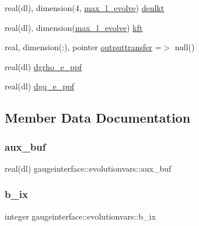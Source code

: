 \begin{DoxyCompactItemize}
real(dl), dimension(4, \mbox{\hyperlink{namespacegaugeinterface_a965f8caba9ba282e718281110e274b04}{max\+\_\+l\+\_\+evolve}}) \mbox{\hyperlink{structgaugeinterface_1_1evolutionvars_ad9969aa011666e0d7a0da67075be6c06}{denlkt}}
\item 
real(dl), dimension(\mbox{\hyperlink{namespacegaugeinterface_a965f8caba9ba282e718281110e274b04}{max\+\_\+l\+\_\+evolve}}) \mbox{\hyperlink{structgaugeinterface_1_1evolutionvars_a8e074f62e4ed5e82fbe9eb46f17981c9}{kft}}
\item 
real, dimension(\+:), pointer \mbox{\hyperlink{structgaugeinterface_1_1evolutionvars_a054b51313d8f8339be066cf5c2b18311}{outputtransfer}} =$>$ null()
\item 
real(dl) \mbox{\hyperlink{structgaugeinterface_1_1evolutionvars_aa21d8b785e5c85c971f522577635ea9a}{dgrho\+\_\+e\+\_\+ppf}}
\item 
real(dl) \mbox{\hyperlink{structgaugeinterface_1_1evolutionvars_a2617a17bdf4a3c6e88026471ac9ff0c3}{dgq\+\_\+e\+\_\+ppf}}
\end{DoxyCompactItemize}


\subsection{Member Data Documentation}
\mbox{\label{structgaugeinterface_1_1evolutionvars_a711dcaaf4415a021db3f399bf58abd7f}} 
\subsubsection{\texorpdfstring{aux\+\_\+buf}{aux\_buf}}
{\footnotesize\ttfamily real(dl) gaugeinterface\+::evolutionvars\+::aux\+\_\+buf}

\mbox{\label{structgaugeinterface_1_1evolutionvars_a4ff42cff96d4117cf7c8779b89bfd4a2}} 
\subsubsection{\texorpdfstring{b\+\_\+ix}{b\_ix}}
{\footnotesize\ttfamily integer gaugeinterface\+::evolutionvars\+::b\+\_\+ix}

